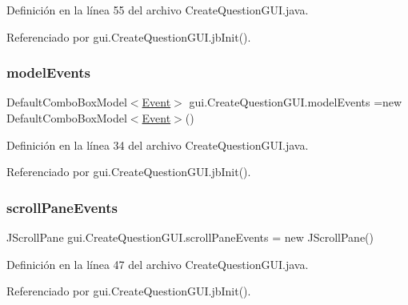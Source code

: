Definición en la línea 55 del archivo Create\+Question\+G\+U\+I.\+java.



Referenciado por gui.\+Create\+Question\+G\+U\+I.\+jb\+Init().

\mbox{\label{classgui_1_1CreateQuestionGUI_a95eda1d4dff395e54c15f08cc579f613}} 
\subsubsection{\texorpdfstring{modelEvents}{modelEvents}}
{\footnotesize\ttfamily Default\+Combo\+Box\+Model$<$\mbox{\hyperlink{classdomain_1_1Event}{Event}}$>$ gui.\+Create\+Question\+G\+U\+I.\+model\+Events =new Default\+Combo\+Box\+Model$<$\mbox{\hyperlink{classdomain_1_1Event}{Event}}$>$()\hspace{0.3cm}{\ttfamily [package]}}



Definición en la línea 34 del archivo Create\+Question\+G\+U\+I.\+java.



Referenciado por gui.\+Create\+Question\+G\+U\+I.\+jb\+Init().

\mbox{\label{classgui_1_1CreateQuestionGUI_ae783664b007ad81c7b0ef9bd59ec9b4a}} 
\subsubsection{\texorpdfstring{scrollPaneEvents}{scrollPaneEvents}}
{\footnotesize\ttfamily J\+Scroll\+Pane gui.\+Create\+Question\+G\+U\+I.\+scroll\+Pane\+Events = new J\+Scroll\+Pane()\hspace{0.3cm}{\ttfamily [private]}}



Definición en la línea 47 del archivo Create\+Question\+G\+U\+I.\+java.



Referenciado por gui.\+Create\+Question\+G\+U\+I.\+jb\+Init().

\mbox{\label{classgui_1_1CreateQuestionGUI_a8fb77e14fbe05d7368fabf0a88575184}} 
